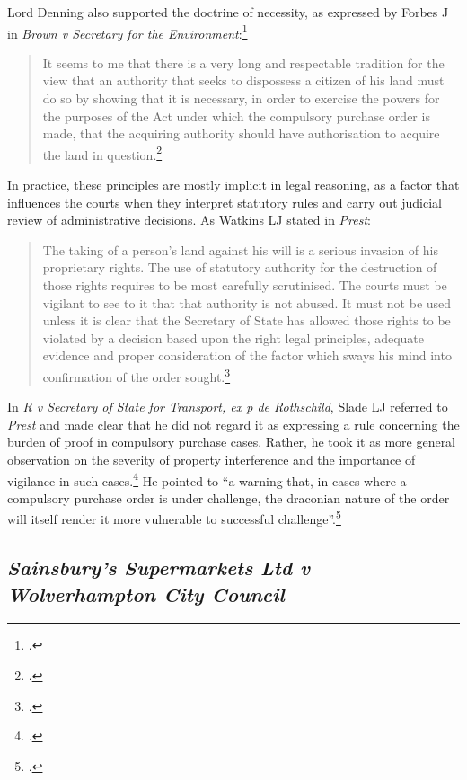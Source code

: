 Lord Denning also supported the doctrine of necessity, as expressed by Forbes J in {\it Brown v Secretary for the Environment}:\footcite{brown78}

\begin{quote}It seems to me that there is a very long and respectable tradition for the view that an authority that seeks to dispossess a citizen of his land must do so by showing that it is necessary, in order to exercise the powers for the purposes of the Act under which the compulsory purchase order is made, that the acquiring authority should have authorisation to acquire the land in question.\footcite[291]{brown78}
\end{quote}

In practice, these principles are mostly implicit in legal reasoning, as a factor that influences the courts when they interpret statutory rules and carry out judicial review of administrative decisions. As Watkins LJ stated in {\it Prest}:

\begin{quote}
The taking of a person's land against his will is a serious invasion of his proprietary rights. The use of statutory authority for the destruction of those rights requires to be most carefully scrutinised. The courts must be vigilant to see to it that that authority is not abused. It must not be used unless it is clear that the Secretary of State has allowed those rights to be violated by a decision based upon the right legal principles, adequate evidence and proper consideration of the factor which sways his mind into confirmation of the order sought.\footcite[211-212]{prest82}
\end{quote}

In {\it R v Secretary of State for Transport, ex p de Rothschild}, Slade LJ referred to {\it Prest} and made clear that he did not regard it as expressing a rule concerning the burden of proof in compulsory purchase cases. Rather, he took it as more general observation on the severity of property interference and the importance of vigilance in such cases.\footcite{rothschild89} He pointed to ``a warning that, in cases where a compulsory purchase order is under challenge, the draconian nature of the order will itself render it more vulnerable to successful challenge''.\footcite[938]{rothschild89}

\subsection{{\it Sainsbury's Supermarkets Ltd v Wolverhampton City Council}}

